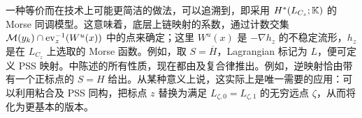 一种等价而在技术上可能更简洁的做法，可以追溯到，即采用 $H^*(L_{C_z};\mathbb K)$ 的 Morse 同调模型。这意味着，底层上链映射的系数，通过计数交集 $\mathcal M(y_k)\cap\operatorname{ev}_z^{-1}(W^u(x))$ 中的点来确定；这里 $W^u(x)$ 是 $-\nabla h_z$ 的不稳定流形，$h_z$ 是在 $L_{C_z}$ 上选取的 Morse 函数。例如，取 $S=\overline H$，Lagrangian 标记为 $L$，便可定义 PSS 映射。中陈述的所有性质，现在都由及复合律推出。例如，逆映射恰由带有一个正标点的 $S=H$ 给出。从某种意义上说，这实际上是唯一需要的应用：可以利用粘合及 PSS 同构，把标点 $z$ 替换为满足 $L_{\zeta,0}=L_{\zeta,1}$ 的无穷远点 $\zeta$，从而将化为更基本的版本。
